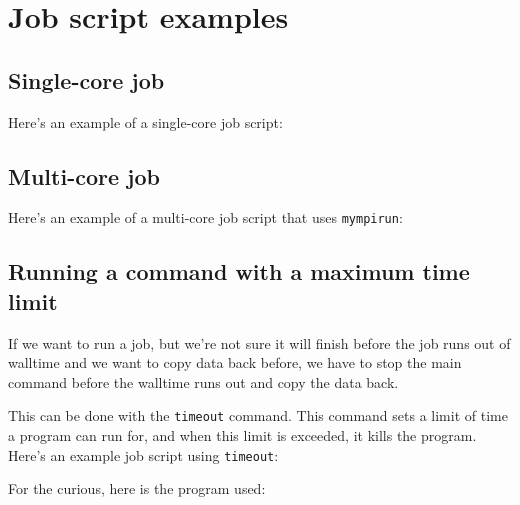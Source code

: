 \chapter{Job script examples}
\label{ch:jobscript-examples}

\section{Single-core job}

Here's an example of a single-core job script:


\section{Multi-core job}

Here's an example of a multi-core job script that uses \lstinline|mympirun|:


\section{Running a command with a maximum time limit}
\label{sec:maximum-timelimit-timeout-jobscript}

If we want to run a job, but we're not sure it will finish before the job runs
out of walltime and we want to copy data back before, we have to stop the main
command before the walltime runs out and copy the data back.

This can be done with the \lstinline|timeout| command. This command sets a limit
of time a program can run for, and when this limit is exceeded, it kills the program.
Here's an example job script using \lstinline|timeout|:


For the curious, here is the program used:

